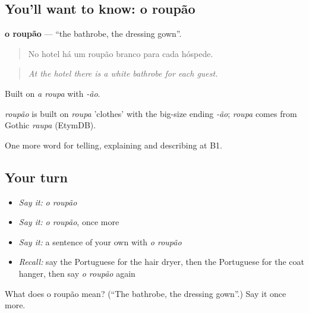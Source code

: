 \subsection*{You'll want to know: o roupão}
\textbf{o roupão} — \textquotedblleft{}the bathrobe, the dressing gown\textquotedblright{}.

\begin{quote}
No hotel há um roupão branco para cada hóspede.
\end{quote}

\begin{quote}
\emph{At the hotel there is a white bathrobe for each guest.}
\end{quote}

Built on \emph{a roupa} with \emph{-ão}.

\begin{cousinweb}
\emph{roupão} is built on \emph{roupa} 'clothes' with the big-size ending \emph{-ão}; \emph{roupa} comes from Gothic \emph{raupa} (EtymDB).
\end{cousinweb}

\begin{grammarlens}[title={What you've built}]
One more word for telling, explaining and describing at B1.
\end{grammarlens}

\subsection*{Your turn}
\begin{itemize}
\raggedright
  \item \emph{Say it:} \emph{o roupão}
  \item \emph{Say it:} \emph{o roupão}, once more
  \item \emph{Say it:} a sentence of your own with \emph{o roupão}
  \item \emph{Recall:} say the Portuguese for the hair dryer, then the Portuguese for the coat hanger, then say \emph{o roupão} again
\end{itemize}

\begin{tcolorbox}[breakable,colback=teal!4,colframe=teal!35!black,title={Before you move on}]
What does o roupão mean? (\textquotedblleft{}The bathrobe, the dressing gown\textquotedblright{}.) Say it once more.
\end{tcolorbox}
